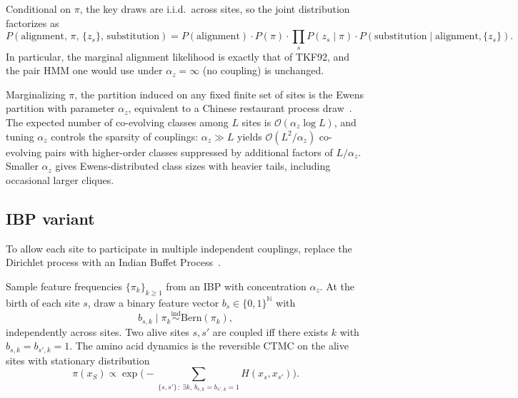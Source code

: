 \begin{remark}[Factorization]
Conditional on $\pi$, the key draws are i.i.d.\ across sites, so the
joint distribution factorizes as
\[
    P(\mathrm{alignment},\, \pi,\, \{z_s\},\, \mathrm{substitution})
    = P(\mathrm{alignment}) \cdot P(\pi) \cdot \prod_s P(z_s \mid \pi)
      \cdot P(\mathrm{substitution} \mid \mathrm{alignment}, \{z_s\}).
\]
In particular, the marginal alignment likelihood is exactly that of
TKF92, and the pair HMM one would use under $\alpha_z = \infty$ (no
coupling) is unchanged.
\end{remark}

\begin{remark}
Marginalizing $\pi$, the partition induced on any fixed finite set
of sites is the Ewens partition with parameter $\alpha_z$,
equivalent to a Chinese restaurant process draw~\citep{aldous1985}.
The expected number of co-evolving classes among $L$ sites is
$\mathcal{O}(\alpha_z \log L)$, and tuning $\alpha_z$ controls the
sparsity of couplings: $\alpha_z \gg L$ yields
$\mathcal{O}(L^2 / \alpha_z)$ co-evolving pairs with higher-order
classes suppressed by additional factors of $L / \alpha_z$. Smaller
$\alpha_z$ gives Ewens-distributed class sizes with heavier tails,
including occasional larger cliques.
\end{remark}

\subsection{IBP variant}
\label{sec:tkfdp-ibp}

To allow each site to participate in multiple independent couplings,
replace the Dirichlet process with an Indian Buffet
Process~\citep{ibp}.

\begin{definition}
Sample feature frequencies $\{\pi_k\}_{k \geq 1}$ from an IBP with
concentration $\alpha_z$. At the birth of each site $s$, draw a
binary feature vector $b_s \in \{0, 1\}^{\mathbb{N}}$ with
\[
    b_{s,k} \mid \pi_k \stackrel{\text{ind}}{\sim} \mathrm{Bern}(\pi_k),
\]
independently across sites. Two alive sites $s, s'$ are coupled iff
there exists $k$ with $b_{s,k} = b_{s',k} = 1$. The amino acid
dynamics is the reversible CTMC on the alive sites with stationary
distribution
\[
    \pi(x_S) \propto \exp\!\Big(-\!\!\sum_{\{s, s'\} \,:\, \exists k,\, b_{s,k} = b_{s',k} = 1} H(x_s, x_{s'})\Big).
\]
\end{definition}


